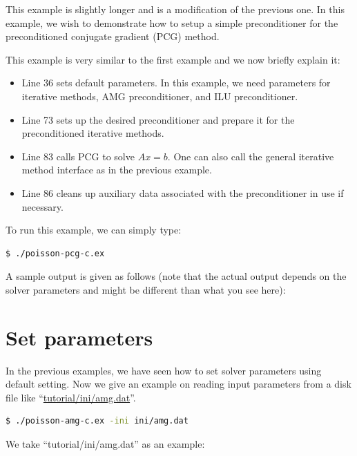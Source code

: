 \documentclass[11pt]{memoir}
\begin{document}
This example is slightly longer and is a modification of the previous one. In this example,  we wish to demonstrate how to setup a simple preconditioner for the preconditioned conjugate gradient (PCG) method.
%

%
This example is very similar to the first example and we now briefly explain it:
\begin{itemize}
%
\item Line 36 sets default parameters. In this example, we need parameters for iterative methods, AMG preconditioner, and ILU preconditioner. 
%
\item Line 73 sets up the desired preconditioner and prepare it for the preconditioned iterative methods.
%
\item Line 83 calls PCG to solve $Ax=b$. One can also call the general iterative method interface as in the previous example.
%
\item Line 86 cleans up auxiliary data associated with the preconditioner in use if necessary. 
%
\end{itemize}
%
To run this example, we can simply type:
%
\begin{lstlisting}[numbers=none]
$ ./poisson-pcg-c.ex
\end{lstlisting}
%
A sample output is given as follows (note that the actual output depends on the solver parameters and might be different than what you see here):



\section{Set parameters}\label{sec:parameters}

In the previous examples, we have seen how to set solver parameters using default setting. Now we give an example on reading input parameters from a disk file like ``\url{tutorial/ini/amg.dat}''. 
%
\begin{lstlisting}[numbers=none,language=sh]
$ ./poisson-amg-c.ex -ini ini/amg.dat
\end{lstlisting}
%
We take ``tutorial/ini/amg.dat'' as an example:

\end{document}
